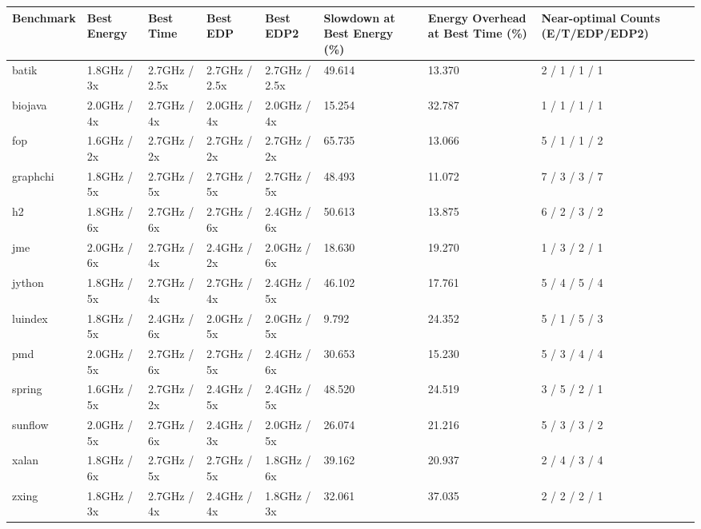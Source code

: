 \begin{tabular}{llllllll}
\hline
Benchmark & Best Energy & Best Time & Best EDP & Best EDP2 & Slowdown at Best Energy (\%) & Energy Overhead at Best Time (\%) & Near-optimal Counts (E/T/EDP/EDP2) \\
\hline
batik & 1.8GHz / 3x & 2.7GHz / 2.5x & 2.7GHz / 2.5x & 2.7GHz / 2.5x & 49.614 & 13.370 & 2 / 1 / 1 / 1 \\
biojava & 2.0GHz / 4x & 2.7GHz / 4x & 2.0GHz / 4x & 2.0GHz / 4x & 15.254 & 32.787 & 1 / 1 / 1 / 1 \\
fop & 1.6GHz / 2x & 2.7GHz / 2x & 2.7GHz / 2x & 2.7GHz / 2x & 65.735 & 13.066 & 5 / 1 / 1 / 2 \\
graphchi & 1.8GHz / 5x & 2.7GHz / 5x & 2.7GHz / 5x & 2.7GHz / 5x & 48.493 & 11.072 & 7 / 3 / 3 / 7 \\
h2 & 1.8GHz / 6x & 2.7GHz / 6x & 2.7GHz / 6x & 2.4GHz / 6x & 50.613 & 13.875 & 6 / 2 / 3 / 2 \\
jme & 2.0GHz / 6x & 2.7GHz / 4x & 2.4GHz / 2x & 2.0GHz / 6x & 18.630 & 19.270 & 1 / 3 / 2 / 1 \\
jython & 1.8GHz / 5x & 2.7GHz / 4x & 2.7GHz / 4x & 2.4GHz / 5x & 46.102 & 17.761 & 5 / 4 / 5 / 4 \\
luindex & 1.8GHz / 5x & 2.4GHz / 6x & 2.0GHz / 5x & 2.0GHz / 5x & 9.792 & 24.352 & 5 / 1 / 5 / 3 \\
pmd & 2.0GHz / 5x & 2.7GHz / 6x & 2.7GHz / 5x & 2.4GHz / 6x & 30.653 & 15.230 & 5 / 3 / 4 / 4 \\
spring & 1.6GHz / 5x & 2.7GHz / 2x & 2.4GHz / 5x & 2.4GHz / 5x & 48.520 & 24.519 & 3 / 5 / 2 / 1 \\
sunflow & 2.0GHz / 5x & 2.7GHz / 6x & 2.4GHz / 3x & 2.0GHz / 5x & 26.074 & 21.216 & 5 / 3 / 3 / 2 \\
xalan & 1.8GHz / 6x & 2.7GHz / 5x & 2.7GHz / 5x & 1.8GHz / 6x & 39.162 & 20.937 & 2 / 4 / 3 / 4 \\
zxing & 1.8GHz / 3x & 2.7GHz / 4x & 2.4GHz / 4x & 1.8GHz / 3x & 32.061 & 37.035 & 2 / 2 / 2 / 1 \\
\hline
\end{tabular}
